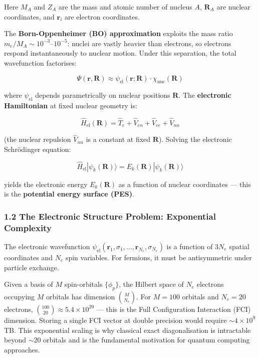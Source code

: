\documentclass[
  11pt,
]{report}
\begin{document}
Here \(M_A\) and \(Z_A\) are the mass and atomic number of nucleus
\(A\), \(\mathbf{R}_A\) are nuclear coordinates, and \(\mathbf{r}_i\)
are electron coordinates.

The \textbf{Born-Oppenheimer (BO) approximation} exploits the mass ratio
\(m_e / M_A \sim 10^{-3}\)--\(10^{-5}\): nuclei are vastly heavier than
electrons, so electrons respond instantaneously to nuclear motion. Under
this separation, the total wavefunction factorises:

\[\Psi(\mathbf{r}, \mathbf{R}) \approx \psi_{\text{el}}(\mathbf{r}; \mathbf{R}) \cdot \chi_{\text{nuc}}(\mathbf{R})\]

where \(\psi_{\text{el}}\) depends parametrically on nuclear positions
\(\mathbf{R}\). The \textbf{electronic Hamiltonian} at fixed nuclear
geometry is:

\[\hat{H}_{\text{el}}(\mathbf{R}) = \hat{T}_e + \hat{V}_{en} + \hat{V}_{ee} + \hat{V}_{nn}\]

(the nuclear repulsion \(\hat{V}_{nn}\) is a constant at fixed
\(\mathbf{R}\)). Solving the electronic Schrödinger equation:

\[\hat{H}_{\text{el}}|\psi_k(\mathbf{R})\rangle = E_k(\mathbf{R})|\psi_k(\mathbf{R})\rangle\]

yields the electronic energy \(E_k(\mathbf{R})\) as a function of
nuclear coordinates --- this is the \textbf{potential energy surface
(PES)}.

\subsubsection{1.2 The Electronic Structure Problem: Exponential
Complexity}\label{the-electronic-structure-problem-exponential-complexity}

The electronic wavefunction
\(\psi_{\text{el}}(\mathbf{r}_1, \sigma_1, \ldots, \mathbf{r}_{N_e}, \sigma_{N_e})\)
is a function of \(3N_e\) spatial coordinates and \(N_e\) spin
variables. For fermions, it must be antisymmetric under particle
exchange.

Given a basis of \(M\) spin-orbitals \(\{\phi_p\}\), the Hilbert space
of \(N_e\) electrons occupying \(M\) orbitals has dimension
\(\binom{M}{N_e}\). For \(M = 100\) orbitals and \(N_e = 20\) electrons,
\(\binom{100}{20} \approx 5.4 \times 10^{20}\) --- this is the Full
Configuration Interaction (FCI) dimension. Storing a single FCI vector
at double precision would require \(\sim 4 \times 10^9\) TB. This
exponential scaling is why classical exact diagonalisation is
intractable beyond \(\sim 20\) orbitals and is the fundamental
motivation for quantum computing approaches.
\end{document}
